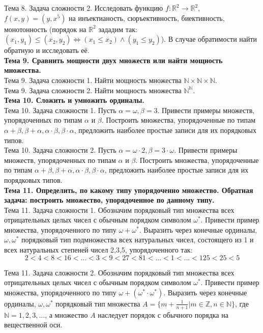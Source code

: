 \documentclass[12pt,oneside]{article}
\theoremstyle{definition}
\begin{document}
Тема 8. Задача сложности 2. Исследовать функцию $f\colon \mathbb{R}^2\to \mathbb{R}^2$, $f(x,y)=(y,x^5)$ на инъектианость, сюръективность, биективность, монотонность (порядок на $\mathbb{R}^2$ зададим так: $(x_1,y_1)\leq (x_2,y_2)\iff (x_1\leq x_2)\wedge (y_1\leq y_2)$). В случае обратимости найти обратную и исследовать её.\\



{\bf Тема 9. Сравнить мощности двух множеств или найти мощность множества.}\\

Тема 9. Задача сложности 1. Найти мощность множества $\mathbb{N}\times \mathbb{N}\times \mathbb{N}$.\\

Тема 9. Задача сложности 2. Найти мощность множества $\mathbb{N}^\mathbb{N}$.\\


{\bf Тема 10. Сложить и умножить ординалы.}\\

Тема 10. Задача сложности 1. Пусть $\alpha=\omega, \beta=3$. Привести примеры множеств, упорядоченных по типам $\alpha$ и $\beta$. Построить множества, упорядоченные по типам $\alpha+\beta, \beta+\alpha, \alpha\cdot\beta, \beta\cdot\alpha$, предложить наиболее простые записи для их порядковых типов.\\

Тема 10. Задача сложности 2. Пусть $\alpha=\omega\cdot 2, \beta=3\cdot \omega$. Привести примеры множеств, упорядоченных по типам $\alpha$ и $\beta$. Построить множества, упорядоченные по типам $\alpha+\beta, \beta+\alpha, \alpha\cdot\beta, \beta\cdot\alpha$, предложить наиболее простые записи для их порядковых типов.\\


{\bf Тема 11. Определить, по какому типу упорядоченно множество. Обратная задача: построить множество, упорядоченное по данному типу.}\\

Тема 11. Задача сложности 1. Обозначим порядковый тип множества всех отрицательных целых чисел с обычным порядком символом $\omega^*$. Привести пример множества, упорядоченного по типу $\omega+\omega^*$. Выразить через конечные ординалы, $\omega, \omega^*$ порядковый тип подмножества всех натуральных чисел, состоящего из 1 и всех натуральных степеней чисел 2,3,5,  упорядоченного так: $$2<4<8<16<...<3<9<27<81<...<1<...<125<25<5$$

Тема 11. Задача сложности 2. Обозначим порядковый тип множества всех отрицательных целых чисел с обычным порядком символом $\omega^*$. Привести пример множества, упорядоченного по типу $\omega+(\omega^*\cdot \omega^*)$. Выразить через конечные ординалы, $\omega, \omega^*$ порядковый тип множества $A=\{m+\frac{1}{n+1} | m\in\mathbb{Z}, n\in\mathbb{N}\}$, где $\mathbb{N}=1,2,3,\dots$, а множество $A$ наследует порядок с обычного порядка на вещественной оси.\\  
\end{document}
